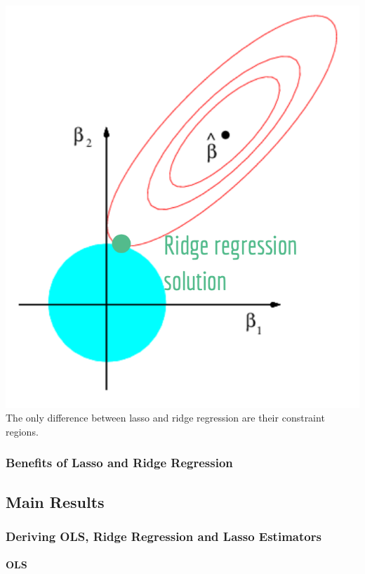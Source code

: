 \documentclass[
]{article}
\begin{document}
\includegraphics{ridge_vis.png} The only difference between lasso and
ridge regression are their constraint regions.

\hypertarget{benefits-of-lasso-and-ridge-regression}{%
\subsubsection{Benefits of Lasso and Ridge
Regression}\label{benefits-of-lasso-and-ridge-regression}}

\hypertarget{main-results}{%
\subsection{Main Results}\label{main-results}}

\hypertarget{deriving-ols-ridge-regression-and-lasso-estimators}{%
\subsubsection{Deriving OLS, Ridge Regression and Lasso
Estimators}\label{deriving-ols-ridge-regression-and-lasso-estimators}}

\hypertarget{ols}{%
\paragraph{OLS}\label{ols}}
\end{document}
